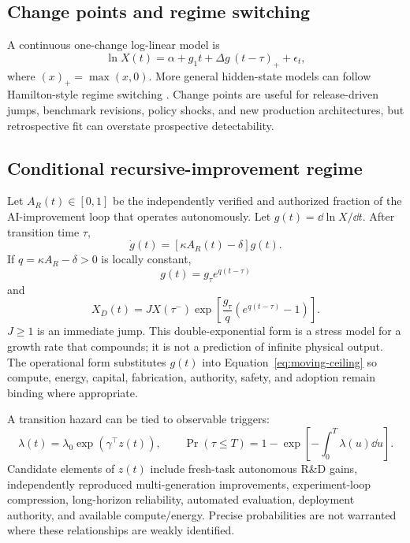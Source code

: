 \subsection{Change points and regime switching}

A continuous one-change log-linear model is
\begin{equation}
\ln X(t)=\alpha+g_1t+\Delta g\,(t-\tau)_+ + \epsilon_t,
\end{equation}
where $(x)_+=\max(x,0)$. More general hidden-state models can follow Hamilton-style regime switching \citep{hamilton1989}. Change points are useful for release-driven jumps, benchmark revisions, policy shocks, and new production architectures, but retrospective fit can overstate prospective detectability.

\subsection{Conditional recursive-improvement regime}

Let $A_R(t)\in[0,1]$ be the independently verified and authorized fraction of the AI-improvement loop that operates autonomously. Let $g(t)=\dd\ln X/\dd t$. After transition time $\tau$,
\begin{equation}
\label{eq:recursive-g}
\dot g(t)=\left[\kappa A_R(t)-\delta\right]g(t).
\end{equation}
If $q=\kappa A_R-\delta>0$ is locally constant,
\begin{equation}
g(t)=g_\tau e^{q(t-\tau)}
\end{equation}
and
\begin{equation}
\label{eq:double-exp}
\boxed{X_D(t)=JX(\tau^-)\exp\left[\frac{g_\tau}{q}\left(e^{q(t-\tau)}-1\right)\right].}
\end{equation}
$J\ge1$ is an immediate jump. This double-exponential form is a stress model for a growth rate that compounds; it is not a prediction of infinite physical output. The operational form substitutes $g(t)$ into Equation~\eqref{eq:moving-ceiling} so compute, energy, capital, fabrication, authority, safety, and adoption remain binding where appropriate.

A transition hazard can be tied to observable triggers:
\begin{equation}
\lambda(t)=\lambda_0\exp(\gamma^\top z(t)),\qquad
\Pr(\tau\le T)=1-\exp\left[-\int_0^T\lambda(u)\dd u\right].
\end{equation}
Candidate elements of $z(t)$ include fresh-task autonomous R\&D gains, independently reproduced multi-generation improvements, experiment-loop compression, long-horizon reliability, automated evaluation, deployment authority, and available compute/energy. Precise probabilities are not warranted where these relationships are weakly identified.

